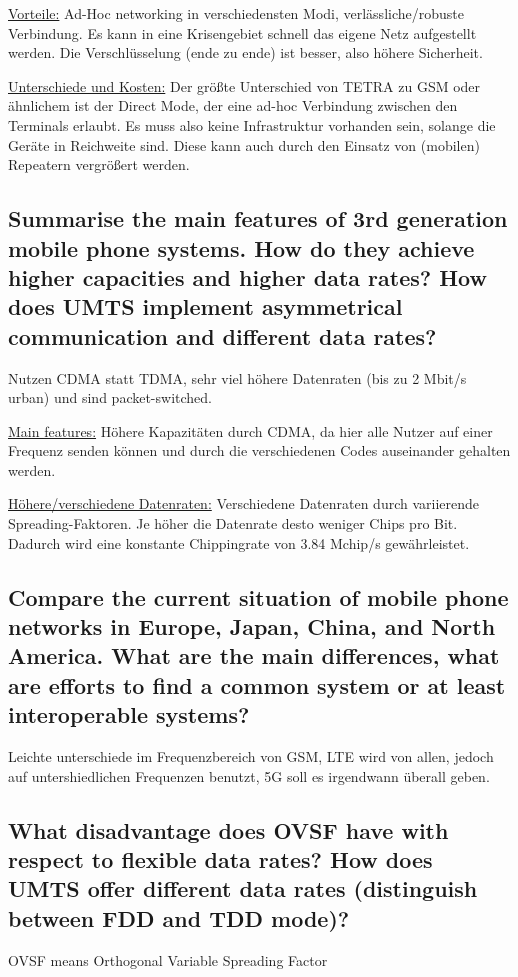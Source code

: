 \underline{Vorteile:} Ad-Hoc networking in verschiedensten Modi, verlässliche/robuste Verbindung. Es kann in eine Krisengebiet schnell das eigene Netz aufgestellt werden. Die Verschlüsselung (ende zu ende) ist besser, also höhere Sicherheit.

\underline{Unterschiede und Kosten:} Der größte Unterschied von TETRA zu GSM oder ähnlichem ist der Direct Mode, der eine ad-hoc Verbindung zwischen den Terminals erlaubt. Es muss also keine Infrastruktur vorhanden sein, solange die Geräte in Reichweite sind. Diese kann auch durch den Einsatz von (mobilen) Repeatern vergrößert werden.

\subsection{Summarise the main features of 3rd generation mobile phone systems. How do they achieve higher capacities and higher data rates? How does UMTS implement asymmetrical communication and different data rates?}
Nutzen CDMA statt TDMA, sehr viel höhere Datenraten (bis zu 2 Mbit/s urban) und sind packet-switched.

\underline{Main features:} Höhere Kapazitäten durch CDMA, da hier alle Nutzer auf einer Frequenz senden können und durch die verschiedenen Codes auseinander gehalten werden.

\underline{Höhere/verschiedene Datenraten:} Verschiedene Datenraten durch variierende Spreading-Faktoren. Je höher die Datenrate desto weniger Chips pro Bit. Dadurch wird eine konstante Chippingrate von 3.84 Mchip/s gewährleistet.

\subsection{Compare the current situation of mobile phone networks in Europe, Japan, China, and North America. What are the main differences, what are efforts to find a common system or at least interoperable systems?}
Leichte unterschiede im Frequenzbereich von GSM, LTE wird von allen, jedoch auf untershiedlichen Frequenzen benutzt, 5G soll es irgendwann überall geben.

\subsection{What disadvantage does OVSF have with respect to flexible data rates? How does UMTS offer different data rates (distinguish between FDD and TDD mode)?}
OVSF means Orthogonal Variable Spreading Factor

